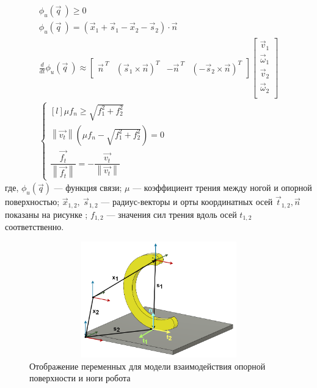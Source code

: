 \begin{align}
    \label{eq:contact_inter}
    \phi_u(\vec{q}\ ) \geqslant 0 \\ 
                        \phi_u(\vec{q}\ ) = (\vec{x}_1 + \vec{s}_1 - \vec{x}_2 - \vec{s}_2) \cdot \vec{n} \\
                        \frac{d }{d t}\phi_u(\vec{q}\ ) \approx \begin{bmatrix}
                            \vec{n}^{\ T} & (\vec{s}_1 \times \vec{n})^T & -\vec{n}^{\ T} & (-\vec{s}_2 \times \vec{n})^T
                        \end{bmatrix} \begin{bmatrix}
                            \vec{v}_1\\ 
                        \vec{\omega}_1\\ 
                        \vec{v}_2\\
                        \vec{\omega}_2\\
                        \end{bmatrix} \\
\left\{\begin{matrix*}[l]
\mu f_n \geqslant \sqrt{f_1^2 + f_2^2}\\ 
\left\lVert \vec{v_t}\right\rVert (\mu f_n - \sqrt{f_1^2 + f_2^2}) = 0\\
\dfrac{\vec{f_t}}{\left\lVert \vec{f_t}\right\rVert } = - \dfrac{\vec{v_t}}{\left\lVert \vec{v_t}\right\rVert }
\end{matrix*}\right.
\end{align}
где, $\phi_u(\vec{q})$ --- функция связи; $\mu $ --- коэффициент трения между ногой и опорной поверхностью; $\vec{x}_{1,2},\ \vec{s}_{1,2}$ --- радиус-векторы и орты координатных осей $\vec{t}_{1,2}, \vec{n}$ показаны на рисунке ; $ f_{1,2} $ --- значения сил трения вдоль осей $t_{1,2}$ соответственно.

\begin{figure}[H]
    \centering\includegraphics[height=5cm,width=1\textwidth,keepaspectratio]{images/contact_interaction.png}
    \caption{Отображение переменных для модели взаимодействия опорной поверхности и ноги робота}
    \label{fig:contact_interaction.png}
\end{figure}



